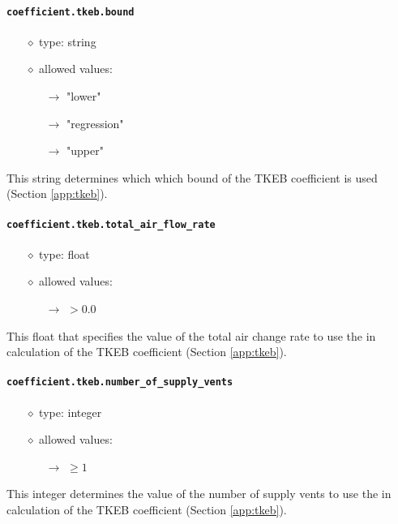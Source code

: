 \documentclass[]{article}
\def\code#1{\texttt{#1}}
\begin{document}
\paragraph{\code{coefficient.tkeb.bound}}
\begin{itemize}
    \item[$\diamond$] type: string 
    \item[$\diamond$] allowed values:
    \begin{itemize}
        \item[$\rightarrow$] "lower"
        \item[$\rightarrow$] "regression"
        \item[$\rightarrow$] "upper"
    \end{itemize}
\end{itemize}
This string determines which which bound of the TKEB coefficient is used
(Section \ref{app:tkeb}).

\paragraph{\code{coefficient.tkeb.total\_air\_flow\_rate}}
\begin{itemize}
    \item[$\diamond$] type: float
    \item[$\diamond$] allowed values:
    \begin{itemize}
        \item[$\rightarrow$] $>0.0$
    \end{itemize}
\end{itemize}
This float that specifies the value of the total air change rate to use the in
calculation of the TKEB coefficient (Section \ref{app:tkeb}).

\paragraph{\code{coefficient.tkeb.number\_of\_supply\_vents}}
\begin{itemize}
    \item[$\diamond$] type: integer 
    \item[$\diamond$] allowed values:
    \begin{itemize}
        \item[$\rightarrow$] $\geq 1$
    \end{itemize}
\end{itemize}
This integer determines the value of the number of supply vents to use the in
calculation of the TKEB coefficient (Section \ref{app:tkeb}).
\end{document}
